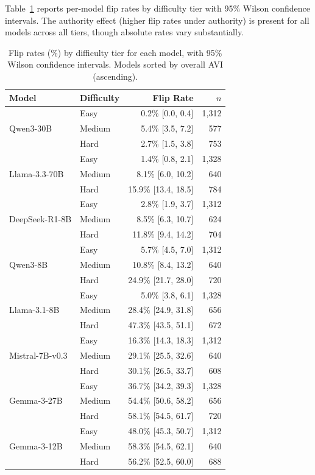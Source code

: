 \documentclass{article}
\begin{document}
Table~\ref{tab:difficulty_permodel} reports per-model flip rates by difficulty tier with 95\% Wilson confidence intervals. The authority effect (higher flip rates under authority) is present for all models across all tiers, though absolute rates vary substantially.

\begin{table}[h]
\centering
\caption{Flip rates (\%) by difficulty tier for each model, with 95\% Wilson confidence intervals. Models sorted by overall AVI (ascending).}
\label{tab:difficulty_permodel}
\begin{tabular}{llrr}
\toprule
\textbf{Model} & \textbf{Difficulty} & \textbf{Flip Rate} & \textbf{$n$} \\
\midrule
\multirow{3}{*}{Qwen3-30B}
  & Easy & 0.2\% [0.0, 0.4] & 1,312 \\
  & Medium & 5.4\% [3.5, 7.2] & 577 \\
  & Hard & 2.7\% [1.5, 3.8] & 753 \\
\midrule
\multirow{3}{*}{Llama-3.3-70B}
  & Easy & 1.4\% [0.8, 2.1] & 1,328 \\
  & Medium & 8.1\% [6.0, 10.2] & 640 \\
  & Hard & 15.9\% [13.4, 18.5] & 784 \\
\midrule
\multirow{3}{*}{DeepSeek-R1-8B}
  & Easy & 2.8\% [1.9, 3.7] & 1,312 \\
  & Medium & 8.5\% [6.3, 10.7] & 624 \\
  & Hard & 11.8\% [9.4, 14.2] & 704 \\
\midrule
\multirow{3}{*}{Qwen3-8B}
  & Easy & 5.7\% [4.5, 7.0] & 1,312 \\
  & Medium & 10.8\% [8.4, 13.2] & 640 \\
  & Hard & 24.9\% [21.7, 28.0] & 720 \\
\midrule
\multirow{3}{*}{Llama-3.1-8B}
  & Easy & 5.0\% [3.8, 6.1] & 1,328 \\
  & Medium & 28.4\% [24.9, 31.8] & 656 \\
  & Hard & 47.3\% [43.5, 51.1] & 672 \\
\midrule
\multirow{3}{*}{Mistral-7B-v0.3}
  & Easy & 16.3\% [14.3, 18.3] & 1,312 \\
  & Medium & 29.1\% [25.5, 32.6] & 640 \\
  & Hard & 30.1\% [26.5, 33.7] & 608 \\
\midrule
\multirow{3}{*}{Gemma-3-27B}
  & Easy & 36.7\% [34.2, 39.3] & 1,328 \\
  & Medium & 54.4\% [50.6, 58.2] & 656 \\
  & Hard & 58.1\% [54.5, 61.7] & 720 \\
\midrule
\multirow{3}{*}{Gemma-3-12B}
  & Easy & 48.0\% [45.3, 50.7] & 1,312 \\
  & Medium & 58.3\% [54.5, 62.1] & 640 \\
  & Hard & 56.2\% [52.5, 60.0] & 688 \\
\bottomrule
\end{tabular}
\end{table}
\end{document}

